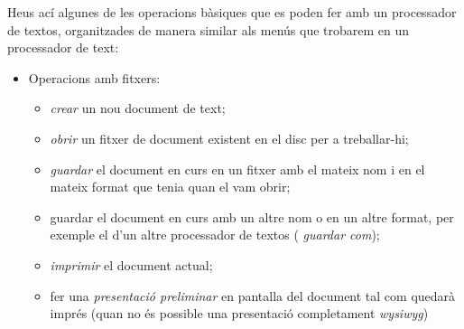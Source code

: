 Heus ací algunes de les operacions bàsiques que es poden fer amb un
processador de textos, organitzades de manera similar als menús que
trobarem en un processador de text:
\begin{itemize}
\item Operacions amb fitxers:
     \begin{itemize}
     \item \emph{crear} un nou document de text;
     \item \emph{obrir} un fitxer de document existent en el disc per
       a treballar-hi;
     \item \emph{guardar} el document en curs en un fitxer amb el
       mateix nom i en el mateix format que tenia quan el vam obrir;
     \item guardar el document en curs amb un altre nom o en un altre
       format, per exemple el d'un altre processador de textos ({\em
         guardar com});
     \item \emph{imprimir} el document actual;
     \item fer una \emph{presentació preliminar} en pantalla del document tal com
       quedarà imprés (quan
           no és possible una presentació completament \emph{wysiwyg})


\end{itemize}
\end{itemize}

